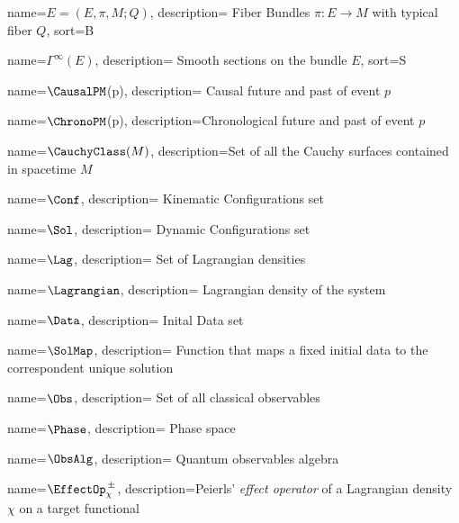\usepackage{glossaries}

\makenoidxglossaries


%
{%
	name={\ensuremath{E = (E,\pi , M;Q)}},
	description={ Fiber Bundles $\pi: E\rightarrow M$ with typical fiber $Q$},
    sort={B}
}

%
{%
	name={\ensuremath{\Gamma^\infty(E)}},
	description={ Smooth sections on the bundle $E$},
    sort={S}
}

	{%
		name={\ensuremath{\CausalPM}(p)},
		description={ Causal future and past of event $p$}
	}	

	{%
		name={\ensuremath{\ChronoPM}(p)},
		description={Chronological future and past of event $p$}
	}

	{%
		name={\ensuremath{\CauchyClass(M)}},
		description={Set of all the Cauchy surfaces contained in spacetime $M$}
	}

	{%
		name={\ensuremath{\Conf}},
		description={ Kinematic Configurations set}
	}

	{%
		name={\ensuremath{\Sol}},
		description={ Dynamic Configurations set}
	}

		
	{%
		name={\ensuremath{\Lag}},
		description={ Set of Lagrangian densities}
	}
		
	{%
		name={\ensuremath{\Lagrangian}},
		description={ Lagrangian density of the system}
	}
		
	{%
		name={\ensuremath{\Data}},
		description={ Inital Data set}
	}
		
	{%
		name={\ensuremath{\SolMap}},
		description={ Function that maps a fixed initial data to the correspondent unique solution}
	}
		
	{%
		name={\ensuremath{\Obs}},
		description={ Set of all classical observables}
	}

	{%
		name={\ensuremath{\Phase}},
		description={ Phase space}
	}
	
	{%
		name={\ensuremath{\ObsAlg}},
		description={ Quantum observables algebra}
	}
	

	
	{%
		name={\ensuremath{\EffectOp_\chi^{\, \pm}}},
		description={Peierls' \emph{effect operator} of a Lagrangian density $\chi$ on a target functional}
	}